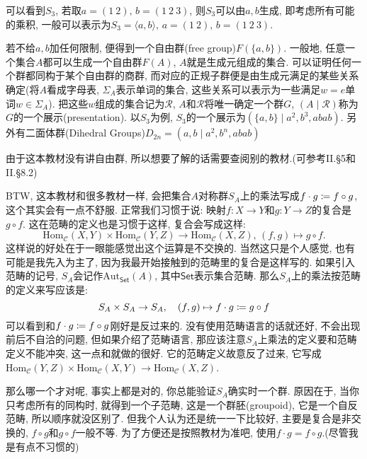 \begin{remark}
    可以看到$S_3$, 若取$a = (1\:2),\, b = (1\:2\:3)$, 则$S_3$可以由$a, b$生成, 即考虑所有可能的乘积, 一般可以表示为$S_3 = \langle a, b \rangle,\, a = (1\:2),\, b = (1\:2\:3)$.
    
    若不给$a, b$加任何限制, 便得到一个自由群(free group)$F(\{a, b\})$. 一般地, 任意一个集合$A$都可以生成一个自由群$F(A)$, $A$就是生成元组成的集合. 可以证明任何一个群都同构于某个自由群的商群, 而对应的正规子群便是由生成元满足的某些关系确定(将$A$看成字母表, $\Sigma_A$表示单词的集合, 这些关系可以表示为一些满足$w = e$单词$w \in \Sigma_A$). 把这些$w$组成的集合记为$\mathscr{R}$, $A$和$\mathscr{R}$将唯一确定一个群$G$, $(A \mid \mathscr{R})$称为$G$的一个展示(presentation). 以$S_3$为例, $S_3$的一个展示为$(\{a, b\} \mid a^2, b^3, abab)$. 另外有二面体群(Dihedral Groups)$D_{2n} = (a, b \mid a^2, b^n, abab)$
    
    由于这本教材没有讲自由群, 所以想要了解的话需要查阅别的教材.(可参考\cite{aluffi2009algebra}II.\S5和II.\S8.2)
    
    BTW, 这本教材和很多教材一样, 会把集合$A$对称群$S_A$上的乘法写成$f \cdot g \mathrel{\coloneqq} f \circ g$, 这个其实会有一点不舒服. 正常我们习惯于说: 映射$f:X \to Y$和$g:Y \to Z$的复合是$g \circ f$. 这在范畴的定义也是习惯于这样, 复合会写成这样:
    \[
        \mathrm{Hom}_{\mathcal{C}}(X, Y) \times \mathrm{Hom}_{\mathcal{C}}(Y, Z) \to \mathrm{Hom}_{\mathcal{C}}(X, Z),\, (f, g) \mapsto g \circ f.
    \]
    这样说的好处在于一眼能感觉出这个运算是不交换的. 当然这只是个人感觉, 也有可能是我先入为主了, 因为我最开始接触到的范畴里的复合是这样写的. 如果引入范畴的记号, $S_A$会记作$\mathrm{Aut}_{\mathsf{Set}}(A)$, 其中$\mathsf{Set}$表示集合范畴. 那么$S_A$上的乘法按范畴的定义来写应该是:
    \[
        S_A \times S_A \to S_A,\quad (f, g) \mapsto f \cdot g \mathrel{\coloneqq} g \circ f
    \]
    可以看到和$f \cdot g \mathrel{\coloneqq} f \circ g$刚好是反过来的. 没有使用范畴语言的话就还好, 不会出现前后不自洽的问题, 但如果介绍了范畴语言, 那应该注意$S_A$上乘法的定义要和范畴定义不能冲突, 这一点\cite{lang2012algebra}和\cite{hungerford2003algebra}就做的很好. 它的范畴定义故意反了过来, 它写成$\mathrm{Hom}_{\mathcal{C}}(Y, Z) \times \mathrm{Hom}_{\mathcal{C}}(X, Y) \to \mathrm{Hom}_{\mathcal{C}}(X, Z)$.
    
    那么哪一个才对呢, 事实上都是对的, 你总能验证$S_A$确实时一个群. 原因在于, 当你只考虑所有的同构时, 就得到一个子范畴, 这是一个群胚(groupoid), 它是一个自反范畴, 所以顺序就没区别了. 但我个人认为还是统一一下比较好, 主要是复合是非交换的, $f \circ g$和$g \circ f$一般不等. 为了方便还是按照教材为准吧, 使用$f \cdot g = f \circ g$.(尽管我是有点不习惯的)
\end{remark}

